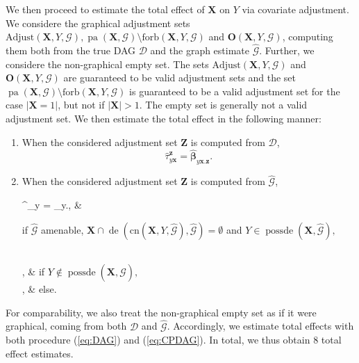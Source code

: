 \documentclass[11pt,a4paper]{article}
\theoremstyle{definition}
\theoremstyle{remark}
\DeclareMathOperator{\pa}{pa}
\DeclareMathOperator{\de}{de}
\DeclareMathOperator{\possde}{possde}
\newcommand{\g}[1][G]{\mathcal{#1}}
\begin{document}
We then proceed to estimate the total effect of $\mathbf{X}$ on $Y$ via covariate adjustment. We considere the graphical adjustment sets  $\text{Adjust}(\mathbf{X},Y,\g),\pa(\mathbf{X},\g) \setminus \textrm{forb}(\mathbf{X},Y,\g)$ and $\textbf{O}(\mathbf{X},Y,\g)$, computing them both from the true DAG $\g[D]$ and the graph estimate $\widehat{\g}$. Further, we considere the non-graphical empty set. The sets $\text{Adjust}(\mathbf{X},Y,\g)$ and $\textbf{O}(\mathbf{X},Y,\g)$ are guaranteed to be valid adjustment sets and the set $\pa(\mathbf{X},\g) \setminus \textrm{forb}(\mathbf{X},Y,\g)$ is guaranteed to be a valid adjustment set for the case $|\mathbf{X}=1|$, but not if $|\mathbf{X}|>1$. The empty set is generally not a valid adjustment set. 
We then estimate the total effect in the following manner: 
\begin{enumerate}
	\item When the considered adjustment set $\mathbf{Z}$ is computed from $\g[D]$,
	\[ 
	\hat{\tau}^{\mathbf{z}}_{y\mathbf{x}}=\boldsymbol{\hat{\beta}}_{y\mathbf{x}.\mathbf{z}}.
	\]
	\label{eq:DAG}
	\item When the considered adjustment set $\mathbf{Z}$ is computed from $\g[\widehat{\g}]$,
	\begin{numcases}{\hat{\tau}^{}_{y} =}
		\boldsymbol{\hat{\beta}}_{y.}, & \parbox{8cm}{if $\g[\widehat{\g}]$ amenable, $\mathbf{X} \cap \de(\text{cn}(\mathbf{X},Y,\g[\widehat{\g}]),\g[\widehat{\g}]) = \emptyset$ and 
		$Y \in \possde(\mathbf{X},\g[\widehat{\g}]),$} \label{fine} \\
		, & if $Y \notin \possde(\mathbf{X},\g[\widehat{\g}]),$ \label{noDesc} \\  
		, & else. \label{noVAS}
\end{numcases}
	\label{eq:CPDAG}
\end{enumerate}
For comparability, we also treat the non-graphical empty set as if it were graphical, coming from both $\g[D]$ and $\widehat{\g}$. Accordingly, we estimate total effects with both procedure (\ref{eq:DAG}) and (\ref{eq:CPDAG}). In total, we thus obtain 8 total effect estimates.
\end{document}
